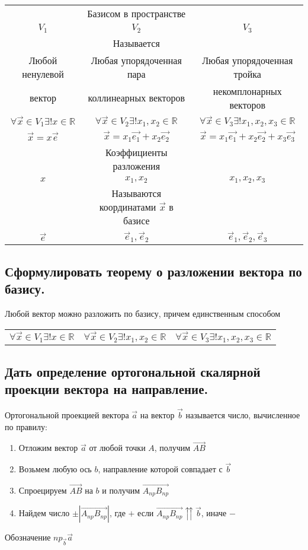 \documentclass[a4paper, 10pt]{article}
\newcommand{\bvec}[1]{\overrightarrow{#1}}
\newcommand{\mcolt}[1]{&#1&}
\begin{document}
\begin{center}
\begin{tabular}{c c c} 
    \mcolt{Базисом в пространстве}\\
    $V_1$&$V_2$&$V_3$\\
    \mcolt{Называется}\\
    Любой ненулевой & Любая упорядоченная пара & Любая упорядоченная тройка\\
    вектор & коллинеарных векторов & некомплонарных векторов\\
    $\forall \vec{x} \in V_1 \exists ! x \in \mathbb{R}$&
    $\forall \vec{x} \in V_2 \exists ! x_1, x_2 \in \mathbb{R}$&
    $\forall \vec{x} \in V_3 \exists ! x_1, x_2, x_3 \in \mathbb{R}$\\
    $\vec{x} = x\vec{e}$ & $\vec{x} = x_1\vec{e_1} + x_2\vec{e_2}$ &
    $\vec{x} = x_1\vec{e_1} + x_2\vec{e_2} + x_3\vec{e_3}$\\
    \mcolt{Коэффициенты разложения}\\
    $x$&$x_1, x_2$&$x_1, x_2, x_3$\\
    \mcolt{Называются координатами $\vec{x}$ в базисе}\\
    $\vec{e}$&$\vec{e}_1, \vec{e}_2$&$\vec{e}_1, \vec{e}_2, \vec{e}_3$\\
\end{tabular}
\end{center}

\subsection{Сформулировать теорему о разложении вектора по базису.}

\begin{center}
Любой вектор можно разложить по базису, причем единственным способом
\begin{tabular}{c c c} 
    $\forall \vec{x} \in V_1 \exists ! x \in \mathbb{R}$&
    $\forall \vec{x} \in V_2 \exists ! x_1, x_2 \in \mathbb{R}$&
    $\forall \vec{x} \in V_3 \exists ! x_1, x_2, x_3 \in \mathbb{R}$\\
\end{tabular}
\end{center}

\subsection{Дать определение ортогональной скалярной проекции вектора на направление.}

Ортогональной проекцией вектора $\vec{a}$ на вектор $\vec{b}$ называется число, вычисленное по правилу:
\begin{enumerate}
    \item Отложим вектор $\vec{a}$ от любой точки $A$, получим $\bvec{AB}$
    \item Возьмем любую ось $b$, направление которой совпадает с $\vec{b}$
    \item Спроецируем $\bvec{AB}$ на $b$ и получим  $\bvec{A_{np}B_{np}}$
    \item Найдем число $\pm |\bvec{A_{np}B_{np}}|$, где $+$ если $\bvec{A_{np}B_{np}} \upuparrows \vec{b}$, иначе $-$
\end{enumerate}
Обозначение $np_{\vec{b}} \vec{a}$
\end{document}
